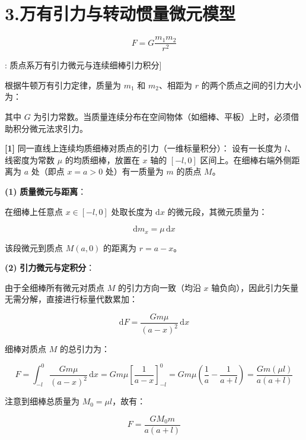 \documentclass[11pt,a4paper,UTF8]{ctexart}
\begin{document}
\section{3.万有引力与转动惯量微元模型}


\begin{equation*}
F = G \frac{m_1 m_2}{r^2}
\end{equation*}
\begin{thmbox}[模型[4]: 质点系万有引力微元与连续细棒引力积分]

根据牛顿万有引力定律，质量为 $m_1$ 和 $m_2$、相距为 $r$ 的两个质点之间的引力大小为：


其中 $G$ 为引力常数。当质量连续分布在空间物体（如细棒、平板）上时，必须借助积分微元法求引力。

\textbf{[1]} 同一直线上连续均质细棒对质点的引力（一维标量积分）：
设有一长度为 $l$、线密度为常数 $\mu$ 的均质细棒，放置在 $x$ 轴的 $[-l, 0]$ 区间上。在细棒右端外侧距离为 $a$ 处（即点 $x = a > 0$ 处）有一质量为 $m$ 的质点 $M$。

\textbf{(1)}  \textbf{质量微元与距离}：

在细棒上任意点 $x \in [-l, 0]$ 处取长度为 $\mathrm{d}x$ 的微元段，其微元质量为：


\begin{equation*}
\mathrm{d}m_x = \mu\,\mathrm{d}x
\end{equation*}


该段微元到质点 $M(a, 0)$ 的距离为 $r = a - x$。

\textbf{(2)}  \textbf{引力微元与定积分}：

由于全细棒所有微元对质点 $M$ 的引力方向一致（均沿 $x$ 轴负向），因此引力矢量无需分解，直接进行标量代数累加：


\begin{equation*}
\mathrm{d}F = \frac{G m \mu}{(a - x)^2}\,\mathrm{d}x
\end{equation*}


细棒对质点 $M$ 的总引力为：


\begin{equation*}
F = \int_{-l}^0 \frac{G m \mu}{(a - x)^2}\,\mathrm{d}x = G m \mu \left[\frac{1}{a - x}\right]_{-l}^0 = G m \mu \left(\frac{1}{a} - \frac{1}{a + l}\right) = \frac{G m (\mu l)}{a(a + l)}
\end{equation*}


注意到细棒总质量为 $M_0 = \mu l$，故有：


\begin{equation*}
F = \frac{G M_0 m}{a(a + l)}
\end{equation*}



\end{thmbox}
\end{document}
